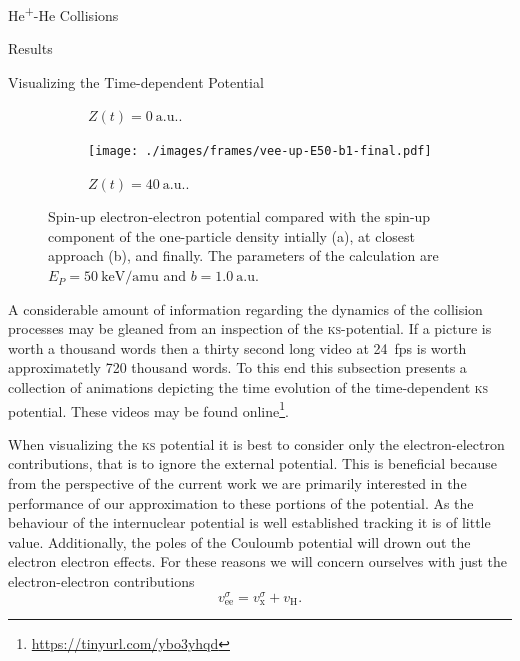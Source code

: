 \documentclass[letterpaper, 11 pt]{report}
\begin{document}
\begin{chapter}{\texorpdfstring{He\textsuperscript{+}}{He+}-He Collisions \label{chap:hephe}}
\begin{section}{Results \label{sec:hephe-disc}}
\begin{subsection}{Visualizing the Time-dependent Potential \label{sec:visual}}
\begin{figure}[t]
\begin{subfigure}{.49\textwidth}
               \caption{$Z(t) = 0~\mathrm{a.u.}$. \label{fig:upC}}
            \end{subfigure}
            \begin{subfigure}{.49\textwidth}
               \centering
               \texttt{[image: ./images/frames/vee-up-E50-b1-final.pdf]}
               \caption{$Z(t) = 40~\mathrm{a.u.}$. \label{fig:upF}}
            \end{subfigure}
            \caption[Spin-up electron-electron potential]
                    {Spin-up electron-electron potential compared with the spin-up component of the
                    one-particle density intially (a), at closest approach (b), and finally.
                    The parameters of the calculation are $E_P = 50~\mathrm{keV/amu}$ and
                    $b = 1.0~\mathrm{a.u.}$ \label{fig:upPlots}}
         \end{figure}

         A considerable amount of information regarding the dynamics of the collision processes may be
         gleaned from an inspection of the \textsc{ks}-potential. If a picture is worth a thousand words
         then a thirty second long video at 24~fps is worth approximatetly 720 thousand words. To this
         end this subsection presents a collection of animations depicting the time evolution of the
         time-dependent \textsc{ks} potential. These videos may be found
         online\footnote{\url{https://tinyurl.com/ybo3yhqd}}.

         When visualizing the \textsc{ks} potential it is best to consider only the electron-electron
         contributions, that is to ignore the external potential. This is beneficial because from the
         perspective of the current work we are primarily interested in the performance of our
         approximation to these portions of the potential. As the behaviour of the internuclear potential
         is well established tracking it is of little value. Additionally, the poles of the Couloumb
         potential will drown out the electron electron effects. For these reasons we will concern
         ourselves with just the electron-electron contributions
         \begin{equation}
            v_\mathrm{ee}^\sigma = v_\mathrm{x}^\sigma + v_\mathrm{H}.
         \end{equation}


\end{subsection}
\end{section}
\end{chapter}
\end{document}
